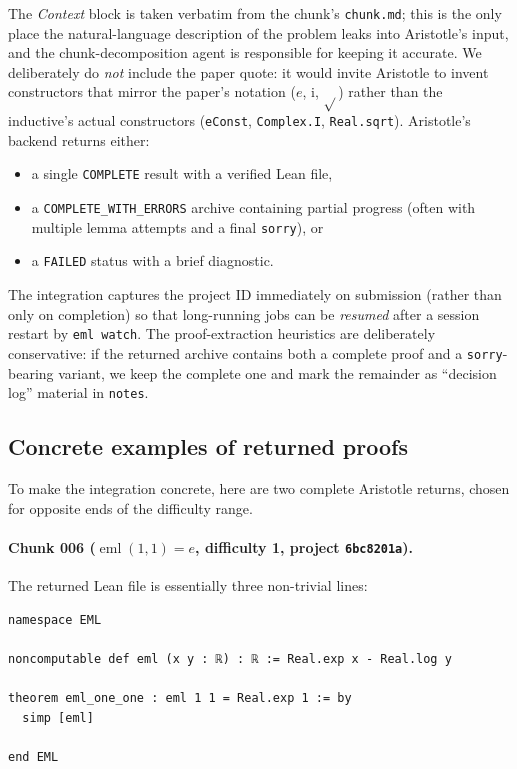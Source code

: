 \documentclass[11pt,a4paper]{article}
\theoremstyle{plain}
\theoremstyle{definition}
\newcommand{\eml}{\operatorname{eml}}
\newcommand{\imu}{\mathrm{i}}
\begin{document}
The \emph{Context} block is taken verbatim from the chunk's
\texttt{chunk.md}; this is the only place the natural-language
description of the problem leaks into Aristotle's input, and the
chunk-decomposition agent is responsible for keeping it accurate.
We deliberately do \emph{not} include the paper quote: it would invite
Aristotle to invent constructors that mirror the paper's notation
($e$, $\imu$, $\sqrt{}$) rather than the inductive's actual constructors
(\texttt{eConst}, \texttt{Complex.I}, \texttt{Real.sqrt}).  Aristotle's
backend returns either:
\begin{itemize}[nosep,leftmargin=*]
  \item a single \texttt{COMPLETE} result with a verified Lean file,
  \item a \texttt{COMPLETE\_WITH\_ERRORS} archive containing partial
    progress (often with multiple lemma attempts and a final
    \texttt{sorry}), or
  \item a \texttt{FAILED} status with a brief diagnostic.
\end{itemize}
The integration captures the project ID immediately on submission
(rather than only on completion) so that long-running jobs can be
\emph{resumed} after a session restart by \texttt{eml watch}.  The
proof-extraction heuristics are deliberately conservative: if the
returned archive contains both a complete proof and a
\texttt{sorry}-bearing variant, we keep the complete one and mark the
remainder as ``decision log'' material in \texttt{notes}.

\subsection{Concrete examples of returned proofs}

To make the integration concrete, here are two complete Aristotle returns,
chosen for opposite ends of the difficulty range.

\paragraph{Chunk 006 ($\eml(1,1)=e$, difficulty 1, project
\texttt{6bc8201a}).}  The returned Lean file is essentially three
non-trivial lines:

\begin{lstlisting}
namespace EML

noncomputable def eml (x y : ℝ) : ℝ := Real.exp x - Real.log y

theorem eml_one_one : eml 1 1 = Real.exp 1 := by
  simp [eml]

end EML
\end{lstlisting}
\end{document}
